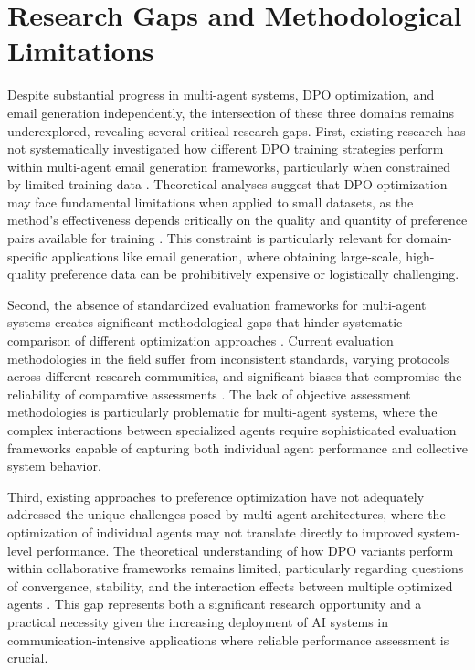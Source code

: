 \section{Research Gaps and Methodological Limitations}

Despite substantial progress in multi-agent systems, DPO optimization, and email generation independently, the intersection of these three domains remains underexplored, revealing several critical research gaps. First, existing research has not systematically investigated how different DPO training strategies perform within multi-agent email generation frameworks, particularly when constrained by limited training data \cite{feng2024dpo_limitations, deng2025preference_data_selection}. Theoretical analyses suggest that DPO optimization may face fundamental limitations when applied to small datasets, as the method's effectiveness depends critically on the quality and quantity of preference pairs available for training \cite{feng2024dpo_limitations}. This constraint is particularly relevant for domain-specific applications like email generation, where obtaining large-scale, high-quality preference data can be prohibitively expensive or logistically challenging.

Second, the absence of standardized evaluation frameworks for multi-agent systems creates significant methodological gaps that hinder systematic comparison of different optimization approaches \cite{li2024generation_to_judgment, gu2024llm_judge_survey}. Current evaluation methodologies in the field suffer from inconsistent standards, varying protocols across different research communities, and significant biases that compromise the reliability of comparative assessments \cite{ni2024mixeval_x, gao2023automatic_assessment}. The lack of objective assessment methodologies is particularly problematic for multi-agent systems, where the complex interactions between specialized agents require sophisticated evaluation frameworks capable of capturing both individual agent performance and collective system behavior.

Third, existing approaches to preference optimization have not adequately addressed the unique challenges posed by multi-agent architectures, where the optimization of individual agents may not translate directly to improved system-level performance. The theoretical understanding of how DPO variants perform within collaborative frameworks remains limited, particularly regarding questions of convergence, stability, and the interaction effects between multiple optimized agents \cite{feng2024dpo_limitations, karthik2024scalable_ranked_preference}. This gap represents both a significant research opportunity and a practical necessity given the increasing deployment of AI systems in communication-intensive applications where reliable performance assessment is crucial.

